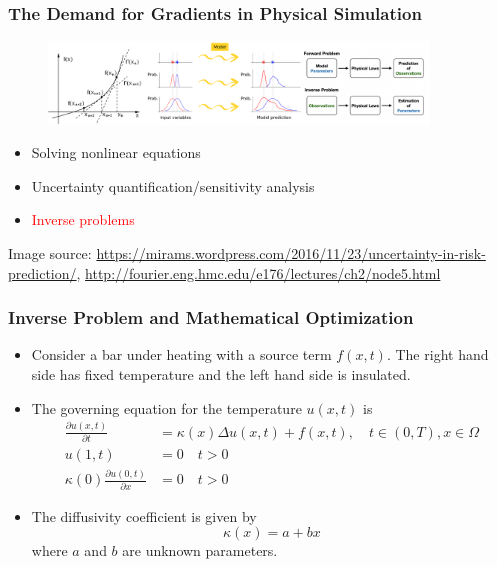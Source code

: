 \documentclass{beamer}
\newcommand{\red}[1]{\textcolor{red}{#1}}
\begin{document}
\begin{frame}
	\frametitle{The Demand for Gradients in Physical Simulation}
	
	\begin{figure}[hbt]
  \includegraphics[width=0.9\textwidth]{figures/illu.png}
\end{figure}

	\begin{itemize}
		\item Solving nonlinear equations
		\item Uncertainty quantification/sensitivity analysis
		\item \red{Inverse problems}
	\end{itemize}
	
	\scriptsize{Image source: \url{https://mirams.wordpress.com/2016/11/23/uncertainty-in-risk-prediction/}, \url{http://fourier.eng.hmc.edu/e176/lectures/ch2/node5.html}}
\end{frame}


\begin{frame}
	\frametitle{Inverse Problem and Mathematical Optimization}
	
	\begin{itemize}
		\item Consider a bar under heating with a source term $f(x,t)$. The right hand side has fixed temperature and the left hand side is insulated. 
		\item The governing equation for the temperature $u(x,t)$ is 
		\begin{align*}
			\frac{\partial u({x}, t)}{\partial t} &= \kappa(x)\Delta u({x}, t) + f({x}, t), \quad t\in (0,T), x\in \Omega\\
			u(1, t) &= 0 \quad t>0\\
			\kappa(0)\frac{\partial u(0,t)}{\partial x} &= 0 \quad t>0
		\end{align*}
		\item The diffusivity coefficient is given by 
		$$\kappa(x) = a + bx$$
		where $a$ and $b$ are unknown parameters. 
	\end{itemize}
\end{frame}
\end{document}
